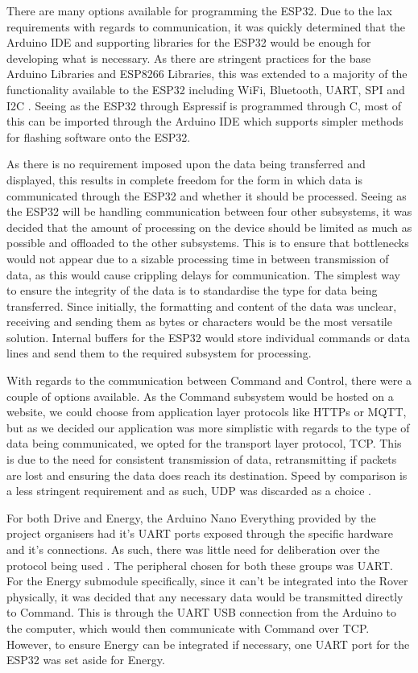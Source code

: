 \documentclass[a4paper]{article}
\begin{document}
There are many options available for programming the ESP32. Due to the 
lax requirements with regards to communication, it was quickly determined 
that the Arduino IDE and supporting libraries for the ESP32 would be 
enough for developing what is necessary. As there are stringent practices 
for the base Arduino Libraries and ESP8266 Libraries, this was extended 
to a majority of the functionality available to the ESP32 including WiFi, 
Bluetooth, UART, SPI and I2C \cite{ESP32ArduinoGithub}. Seeing as the ESP32 
through Espressif is programmed through C, most of this can be imported 
through the Arduino IDE which supports simpler methods for flashing 
software onto the ESP32.

As there is no requirement imposed upon the data being transferred 
and displayed, this results in complete freedom for the form in which 
data is communicated through the ESP32 and whether it should be processed. 
Seeing as the ESP32 will be handling communication between four other 
subsystems, it was decided that the amount of processing on the device 
should be limited as much as possible and offloaded to the other 
subsystems. This is to ensure that bottlenecks would not appear due to a 
sizable processing time in between transmission of data, as this would 
cause crippling delays for communication. The simplest way to ensure the 
integrity of the data is to standardise the type for data being 
transferred. Since initially, the formatting and content of the data was 
unclear, receiving and sending them as bytes or characters would be the 
most versatile solution. Internal buffers for the ESP32 would store 
individual commands or data lines and send them to the required subsystem 
for processing.

With regards to the communication between Command and Control, 
there were a couple of options available. As the Command subsystem 
would be hosted on a website, we could choose from application layer 
protocols like HTTPs or MQTT, but as we decided our application was 
more simplistic with regards to the type of data being communicated, we 
opted for the transport layer protocol, TCP. This is due to the need for 
consistent transmission of data, retransmitting if packets are lost and 
ensuring the data does reach its destination. Speed by comparison is a 
less stringent requirement and as such, UDP was discarded as a choice
\cite{TCPvsUDP}.

For both Drive and Energy, the Arduino Nano Everything provided by the 
project organisers had it’s UART ports exposed through the specific 
hardware and it’s connections. As such, there was little need for 
deliberation over the protocol being used \cite{ArduinoSerial}. The 
peripheral chosen for both these groups was UART. For the Energy 
submodule specifically, since it can’t be integrated into the Rover 
physically, it was decided that any necessary data would be transmitted 
directly to Command. This is through the UART USB connection from the 
Arduino to the computer, which would then communicate with Command over 
TCP. However, to ensure Energy can be integrated if necessary, one UART 
port for the ESP32 was set aside for Energy.
\end{document}
